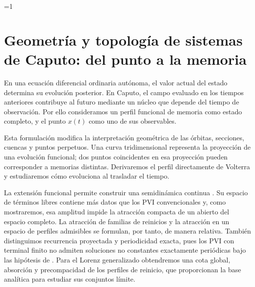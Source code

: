 \def\HAFOCaputoShowMemory{1}
\def\HAFOCaputoShowBasins{1}
\def\HAFOCaputoShowReturn{1}
\def\HAFOCaputoShowProtocol{1}
\ifdefined\HAFOCaputoBlockSelect
  \def\HAFOCaputoShowMemory{0}
  \def\HAFOCaputoShowBasins{0}
  \def\HAFOCaputoShowReturn{0}
  \def\HAFOCaputoShowProtocol{0}
  \ifdefined\HAFOCaputoBlockMemory
    \def\HAFOCaputoShowMemory{1}
  \fi
  \ifdefined\HAFOCaputoBlockBasins
    \def\HAFOCaputoShowBasins{1}
  \fi
  \ifdefined\HAFOCaputoBlockReturn
    \def\HAFOCaputoShowReturn{1}
  \fi
  \ifdefined\HAFOCaputoBlockProtocol
    \def\HAFOCaputoShowProtocol{1}
  \fi
\fi

\ifnum\HAFOCaputoShowMemory=1\relax
\section{Geometría y topología de sistemas de Caputo: del punto a la memoria}
\label{sec:geometria-topologia-caputo}

\HAFOCardMemory

En una ecuación diferencial ordinaria autónoma, el valor actual del estado
determina su evolución posterior. En Caputo, el campo evaluado en los tiempos
anteriores contribuye al futuro mediante un núcleo que depende del tiempo
de observación. Por ello consideramos un perfil funcional de memoria como
estado completo, y el punto \(x(t)\) como uno de sus observables.

Esta formulación modifica la interpretación geométrica de las órbitas,
secciones, cuencas y puntos perpetuos. Una curva tridimensional representa
la proyección de una evolución funcional; dos puntos coincidentes en esa
proyección pueden corresponder a memorias distintas. Derivaremos el perfil
directamente de Volterra y estudiaremos cómo evoluciona al trasladar el
tiempo.

La extensión funcional permite construir una semidinámica continua
\cite{CongTuan2017Nonlocal,DoanKloeden2021Semidynamical}. Su espacio de
términos libres contiene más datos que los PVI convencionales y, como
mostraremos, esa amplitud impide la atracción compacta de un abierto del
espacio completo. La atracción de familias de reinicios y la atracción en un
espacio de perfiles admisibles se formulan, por tanto, de manera relativa.
También distinguimos recurrencia proyectada y periodicidad exacta, pues los
PVI con terminal finito no admiten soluciones no constantes exactamente
periódicas bajo las hipótesis de
\cite{TavazoeiHaeri2009,KaslikSivasundaram2012}. Para el Lorenz generalizado
obtendremos una cota global, absorción y precompacidad de los perfiles de
reinicio, que proporcionan la base analítica para estudiar sus conjuntos
límite.

